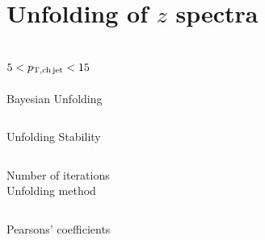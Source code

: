 \documentclass[xcolor={usenames,dvipsnames}]{beamer}
\begin{document}
\section{Unfolding of $z$ spectra}

\subsection{$5<p_{\mathrm{T,ch\, jet}}<15$~\GeVc}

\begin{frame}{Bayesian Unfolding}
\begin{columns}
\centering
\centering
\end{columns}
\end{frame}

\begin{frame}{Unfolding Stability}
\begin{columns}
\centering
\tiny 
Number of iterations\\
\centering
\tiny
Unfolding method\\
\end{columns}
\centering
\tiny
Pearsons' coefficients\\
\end{frame}
\end{document}
